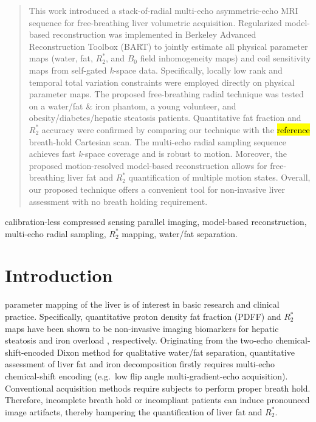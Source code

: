 \documentclass[journal,twoside,web]{ieeecolor}
\begin{document}
\begin{abstract}

This work introduced a stack-of-radial multi-echo asymmetric-echo MRI sequence 
for free-breathing liver volumetric acquisition. 
Regularized model-based reconstruction was implemented 
in Berkeley Advanced Reconstruction Toolbox (BART) 
to jointly estimate all physical parameter maps 
(water, fat, $R_2^*$, and $B_0$ field inhomogeneity maps) 
and coil sensitivity maps from self-gated \textit{k}-space data. 
Specifically, locally low rank and temporal total variation constraints 
were employed directly on physical parameter maps. 
The proposed free-breathing radial technique 
was tested on a water/fat \& iron phantom, a young volunteer, 
and obesity/diabetes/hepatic steatosis patients. 
Quantitative fat fraction and $R_2^*$ accuracy were confirmed 
by comparing our technique with the \hl{reference} breath-hold Cartesian scan.
The multi-echo radial sampling sequence achieves 
fast \textit{k}-space coverage and is robust to motion. 
Moreover, the proposed motion-resolved model-based reconstruction 
allows for free-breathing liver fat and $R_2^*$ quantification 
of multiple motion states. 
Overall, our proposed technique offers a convenient tool 
for non-invasive liver assessment with no breath holding requirement.

\end{abstract}

\begin{IEEEkeywords}
calibration-less compressed sensing parallel imaging, model-based reconstruction, multi-echo radial sampling, $R_2^*$ mapping, water/fat separation.
\end{IEEEkeywords}

\section{Introduction}
\label{sec:introduction}

 parameter mapping of the liver is of interest 
in basic research and clinical practice. Specifically, quantitative 
proton density fat fraction (PDFF) and $R_2^*$ maps have been shown 
to be non-invasive imaging biomarkers for hepatic 
steatosis \cite{caussy_2018_fat,hu_2020_obesity} and 
iron overload \cite{wood_2011_iron,hernando_2014_iron}, respectively. 
Originating from the two-echo chemical-shift-encoded Dixon method 
\cite{dixon_1984_wf} for qualitative water/fat separation, 
quantitative assessment of liver fat and iron decomposition firstly requires 
multi-echo chemical-shift encoding (e.g.~low flip angle multi-gradient-echo acquisition). 
Conventional acquisition methods require subjects to perform proper breath hold. 
Therefore, incomplete breath hold or incompliant patients can induce 
pronounced image artifacts, 
thereby hampering the quantification of liver fat and $R_2^*$.
\end{document}
